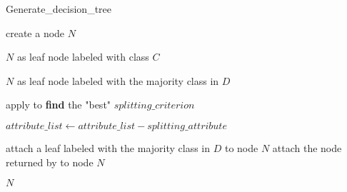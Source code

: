 \documentclass{article}
\begin{document}
                \begin{algorithm}
                    \caption{Generate\_decision\_tree}
                    \begin{algorithmic}[1]


                            \State create a node $N$

                                \State \Return $N$ as leaf node labeled with class $C$
                            \EndIf

                                \State \Return $N$ as leaf node labeled with the majority class in $D$
                            \EndIf

                            \State apply  to \textbf{ find } the "best" $splitting\_criterion$

                                \State $attribute\_list \gets attribute\_list - splitting\_attribute$
                            \EndIf

                                    \State attach a leaf labeled with the majority class in $D$ to node $N$
                                \Else
                                    \State attach the node returned by  to node $N$
                                \EndIf
                            \EndFor

                            \State \Return $N$
                        \EndProcedure
                    \end{algorithmic}
                \end{algorithm}



                \newpage
\end{document}
